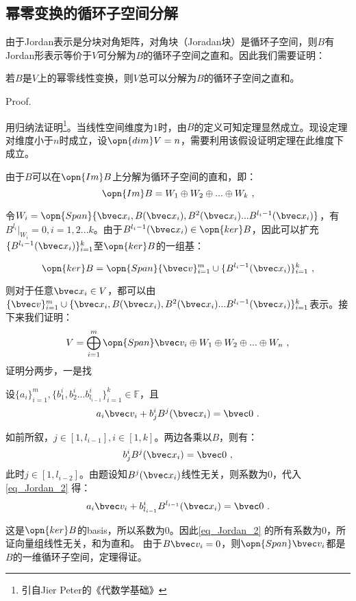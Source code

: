 \subsection{幂零变换的循环子空间分解}

由于Jordan表示是分块对角矩阵，对角块（Joradan块）是循环子空间，则$B$有Jordan形表示等价于$V$可分解为$B$的循环子空间之直和。因此我们需要证明：

\begin{theorem}{}\label{the_Jordan_1}
若$B$是$V$上的幂零线性变换，则$V$总可以分解为$B$的循环子空间之直和。
\end{theorem}
Proof.

用归纳法证明\footnote{引自Jier Peter的《代数学基础》}。当线性空间维度为1时，由$B$的定义可知定理显然成立。现设定理对维度小于$n$时成立，设$\opn{dim}V=n$，需要利用该假设证明定理在此维度下成立。

由于$B$可以在$\opn{Im}B$上分解为循环子空间的直和，即：
\begin{equation}
\opn{Im}B=W_1\oplus W_2\oplus...\oplus W_k~,
\end{equation}

令$W_i=\opn{Span}\{\bvec x_i,B(\bvec x_i),B^2(\bvec x_i)...B^{l_i-1}(\bvec x_i)\}$，有$B^{l_i}|_{W_i}=0,i=1,2...k$。由于$B^{l_i-1}(\bvec x_i)\in \opn{ker}B$，因此可以扩充$\{B^{l_i-1}(\bvec x_i)\}^k_{i=1}$至$\opn{ker}B$的一组基：

\begin{equation}
\opn{ker}B=\opn{Span}\{\bvec v\}^m_{i=1}\cup \{B^{l_i-1}(\bvec x_i)\}^k_{i=1}~,
\end{equation}

则对于任意$\bvec x_i\in V$，都可以由$\{\bvec v\}^m_{i=1}\cup \{\bvec x_i,B(\bvec x_i),B^2(\bvec x_i)...B^{l_i-1}(\bvec x_i)\}^{k}_{i=1}$表示。接下来我们证明：
\begin{equation}
V=\bigoplus ^m_{i=1}\opn{Span}\bvec v_i\oplus W_1\oplus W_2\oplus...\oplus W_n~,
\end{equation}
证明分两步，一是找

设$\{a_i\}^m_{i=1},\{b^i_1,b^i_2...b^i_{l_{i-1}}\}^{k}_{i=1}\in\mathbb F$，且
\begin{equation}\label{eq_Jordan_2}
a_i\bvec v_i+b^i_jB^{j}(\bvec x_i)=\bvec 0~.
\end{equation}

如前所叙，$j\in[1,l_{i-1}],i\in[1,k]$。两边各乘以$B$，则有：
\begin{equation}
b^i_jB^{j}(\bvec x_i)=\bvec 0~,
\end{equation}
此时$j\in[1,l_{i-2}]$。由题设知$B^j(\bvec x_i)$线性无关，则系数为$0$，代入\autoref{eq_Jordan_2} 得：
\begin{equation}
a_i\bvec v_i+b^i_{l_{i-1}}B^{l_{i-1}}(\bvec x_i)=\bvec 0~.
\end{equation}

这是$\opn{ker}B$的basis，所以系数为$0$。因此\autoref{eq_Jordan_2} 的所有系数为0，所证向量组线性无关，和为直和。
由于$B\bvec v_i=0$，则$\opn{Span}\bvec v_i$都是$B$的一维循环子空间，定理得证。


